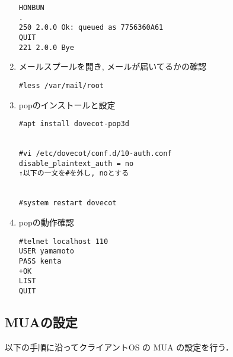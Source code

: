 \documentclass[a4j,titlepage]{jarticle}
\begin{document}
\begin{enumerate}
\begin{center}
\begin{screen}
\begin{verbatim}
HONBUN
.
250 2.0.0 Ok: queued as 7756360A61
QUIT
221 2.0.0 Bye
\end{verbatim}
    \end{screen}
  \end{center}
\item メールスプールを開き, メールが届いてるかの確認
  \begin{center}
    \begin{screen}
\begin{verbatim}
#less /var/mail/root
\end{verbatim}
    \end{screen}
  \end{center}
\item popのインストールと設定
  \begin{center}
    \begin{screen}
\begin{verbatim}
#apt install dovecot-pop3d


#vi /etc/dovecot/conf.d/10-auth.conf
disable_plaintext_auth = no
↑以下の一文を#を外し, noとする


#system restart dovecot
\end{verbatim}
    \end{screen}
  \end{center}
\item popの動作確認
   \begin{center}
    \begin{screen}
\begin{verbatim}
#telnet localhost 110
USER yamamoto
PASS kenta
+OK
LIST
QUIT
\end{verbatim}
    \end{screen}
   \end{center}
\end{enumerate}

\subsection{MUAの設定}
以下の手順に沿ってクライアントOS の MUA の設定を行う．
\end{document}
